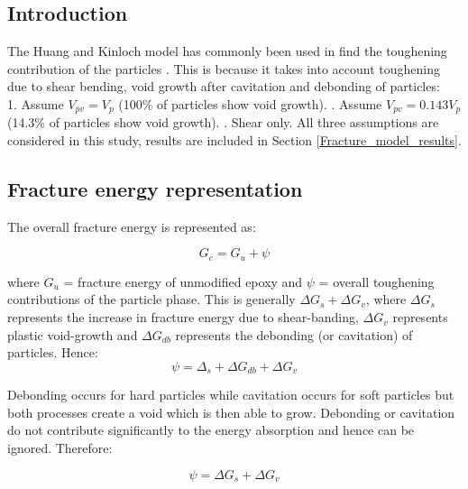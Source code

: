 \documentclass[numbers=noendperiod,chapterprefix=on]{icldt} %
\begin{document}
\subsection{Introduction}
The Huang and Kinloch model \cite{Huang1992c} has commonly been used in find the toughening contribution of the particles \cite{Hsieh2010a,Hsieh2010,Giannakopoulos2011}. This is because it takes into account toughening due to shear bending, void growth after cavitation and debonding of particles:
\\
1.	Assume $ V_{pv} = V_{p} $ (100\% of particles show void growth). 
.	Assume $ V_{pv} = 0.143 V_{p} $ (14.3\% of particles show void growth). 
.	Shear only. 
\newline
All three assumptions are considered in this study, results are included in Section \ref{Fracture_model_results}.

\subsection{Fracture energy representation}

The overall fracture energy is represented as:

\begin{equation} 
G_c= G_u+\psi
\end{equation}

where $G_u$ = fracture energy of unmodified epoxy and $\psi$ = overall toughening contributions of the particle phase. This is generally $\Delta G_s + \Delta G_v$, where $\Delta G_s$ represents the increase in fracture energy due to shear-banding, $\Delta G_v$ represents plastic void-growth and $\Delta G_{db}$ represents the debonding (or cavitation) of particles. Hence:
\begin{equation} 
\psi=\Delta_s+\Delta G_{db}+\Delta G_v
\end{equation}

Debonding occurs for hard particles while cavitation occurs for soft particles \cite{Hsieh2010a,Hsieh2010,Giannakopoulos2011} but both processes create a void which is then able to grow. Debonding or cavitation do not contribute significantly to the energy absorption \cite{Hsieh2010a,Hsieh2010,Giannakopoulos2011} and hence can be ignored. Therefore:

\begin{equation} 
\psi=\Delta G_s+\Delta G_v
\end{equation}
\end{document}
